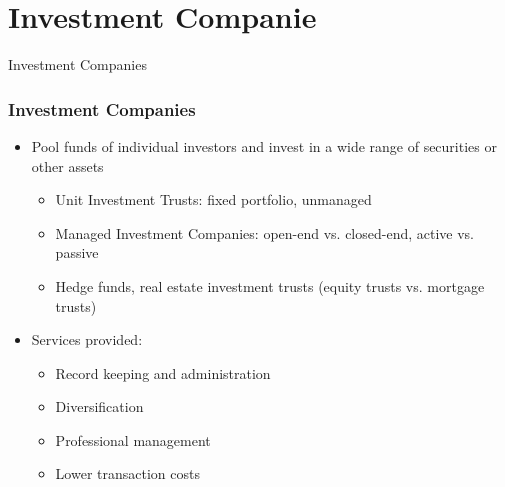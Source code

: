 \documentclass[10pt]{beamer}
\begin{document}
	\section{Investment Companie}
	\begin{frame}
		\begin{center}
			{\Large Investment Companies}
		\end{center}
	\end{frame}
	
	
	
	
	
	
	\begin{frame}
		\frametitle{Investment Companies}
		
		\begin{itemize} 
			\item Pool funds of individual investors and invest in a wide range of securities or other assets
			
			\begin{itemize}
				\item Unit Investment Trusts: fixed portfolio, unmanaged
				\item Managed Investment Companies: open-end vs. closed-end, active vs. passive
				\item Hedge funds, real estate investment trusts (equity trusts vs. mortgage trusts)
			\end{itemize}
			
			
			\item Services provided:
			
			\begin{itemize}
				\item Record keeping and administration 
				\item Diversification
				\item Professional management
				\item Lower transaction costs
			\end{itemize}
			
			
		\end{itemize}
		
	\end{frame}
	
\end{document}
